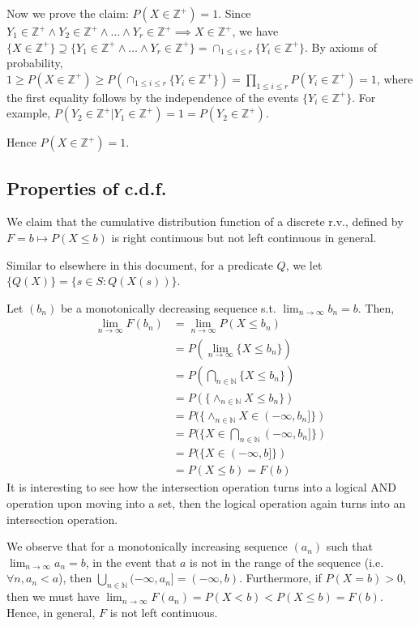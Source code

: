 \documentclass{article}
\begin{document}
Now we prove the claim: $P(X\in \mathbb{Z}^+) = 1$. Since $Y_1 \in \mathbb{Z}^+\land Y_2\in \mathbb{Z}^+\land \dots \land Y_r\in \mathbb{Z}^+\implies X\in \mathbb{Z}^+$, we have $\{X\in \mathbb{Z}^+\}\supseteq \{Y_1 \in \mathbb{Z}^+\land \dots \land Y_r\in \mathbb{Z}^+\} = \cap_{1\leq i\leq r} \{Y_i\in \mathbb{Z}^+\}$. By axioms of probability, $1\geq P(X\in \mathbb{Z}^+)\geq P(\cap_{1\leq i\leq r} \{Y_i\in \mathbb{Z}^+\}) = \prod_{1\leq i\leq r}P(Y_i\in \mathbb{Z}^+)=1$, where the first equality follows by the independence of the events $\{Y_i\in \mathbb{Z}^+\}$. For example, $P(Y_2\in \mathbb{Z}^+ | Y_1\in \mathbb{Z}^+) = 1 = P(Y_2\in \mathbb{Z}^+)$.

Hence $P(X\in \mathbb{Z}^+) = 1$.

\subsection{Properties of c.d.f.} We claim that the cumulative distribution function of a discrete r.v., defined by $F = b\mapsto P(X\leq b)$ is right continuous but not left continuous in general.

Similar to elsewhere in this document, for a predicate $Q$, we let $\{Q(X)\} = \{s\in S : Q(X(s))\}$.

Let $(b_n)$ be a monotonically decreasing sequence s.t. $\lim_{n\rightarrow \infty}b_n = b$. Then,
\begin{align*}
	\lim_{n\rightarrow \infty}F(b_n) &= \lim_{n\rightarrow \infty}P(X\leq b_n)\\
	&= P(\lim_{n\rightarrow \infty}\{X\leq b_n\})\\
	&= P(\bigcap_{n\in \mathbb{N}}\{X\leq b_n\})\\
	&= P(\{\land_{n\in \mathbb{N}}X\leq b_n\})\\
	&= P(\{\land_{n\in \mathbb{N}}X\in (-\infty, b_n]\})\\
	&= P(\{X\in \bigcap_{n\in \mathbb{N}}(-\infty, b_n]\})\\
	&= P(\{X\in (-\infty, b]\})\\
	&= P(X\leq b) = F(b)
\end{align*}
It is interesting to see how the intersection operation turns into a logical AND operation upon moving into a set, then the logical operation again turns into an intersection operation.

We observe that for a monotonically increasing sequence $(a_n)$ such that $\lim_{n\rightarrow \infty}a_n = b$, in the event that $a$ is not in the range of the sequence (i.e. $\forall n, a_n < a$), then $\bigcup_{n\in \mathbb{N}}(-\infty, a_n] = (-\infty, b)$. Furthermore, if $P(X=b) > 0$, then we must have $\lim_{n\rightarrow \infty}F(a_n) = P(X < b) < P(X\leq b) = F(b)$. Hence, in general, $F$ is not left continuous.
\end{document}
